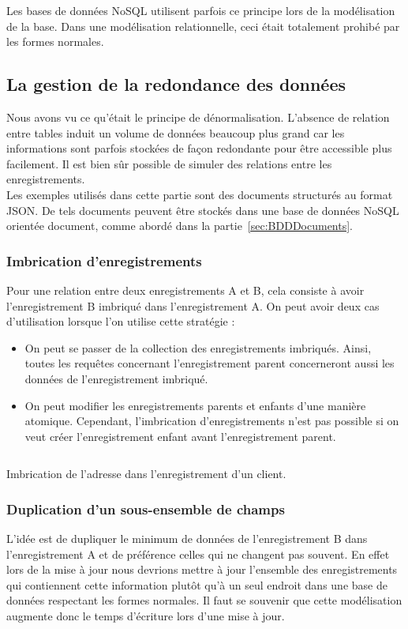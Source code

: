 	Les bases de données NoSQL utilisent parfois ce principe lors de la modélisation de la base. Dans une modélisation relationnelle, ceci était totalement prohibé par les formes normales.

\subsection{La gestion de la redondance des données}
	Nous avons vu ce qu'était le principe de dénormalisation. L'absence de relation entre tables induit un volume de données beaucoup plus grand car les informations sont parfois stockées de façon redondante pour être accessible plus facilement. Il est bien sûr possible de simuler des relations entre les enregistrements.\\

	Les exemples utilisés dans cette partie sont des documents structurés au format JSON. De tels documents peuvent être stockés dans une base de données NoSQL orientée document, comme abordé dans la partie~\ref{sec:BDDDocuments}.

	\subsubsection{Imbrication d'enregistrements}
		Pour une relation entre deux enregistrements A et B, cela consiste à avoir l'enregistrement B imbriqué dans l'enregistrement A. On peut avoir deux cas d'utilisation lorsque l'on utilise cette stratégie :

		\begin{itemize}
			\item On peut se passer de la collection des enregistrements imbriqués. Ainsi, toutes les requêtes concernant l'enregistrement parent concerneront aussi les données de l'enregistrement imbriqué.
			\item On peut modifier les enregistrements parents et enfants d'une manière atomique. Cependant, l'imbrication d'enregistrements n'est pas possible si on veut créer l'enregistrement enfant avant l'enregistrement parent.
		\end{itemize}
		\vspace{20px}

		\begin{listing}[H]
			\inputminted{json}{code/imbrication.json}
			\caption{Imbrication de l'adresse dans l'enregistrement d'un client.}
		\end{listing}

	\subsubsection{Duplication d'un sous-ensemble de champs}
		L'idée est de dupliquer le minimum de données de l'enregistrement B dans l'enregistrement A et de préférence celles qui ne changent pas souvent. En effet lors de la mise à jour nous devrions mettre à jour l'ensemble des enregistrements qui contiennent cette information plutôt qu'à un seul endroit dans une base de données respectant les formes normales. Il faut se souvenir que cette modélisation augmente donc le temps d'écriture lors d'une mise à jour.\\

